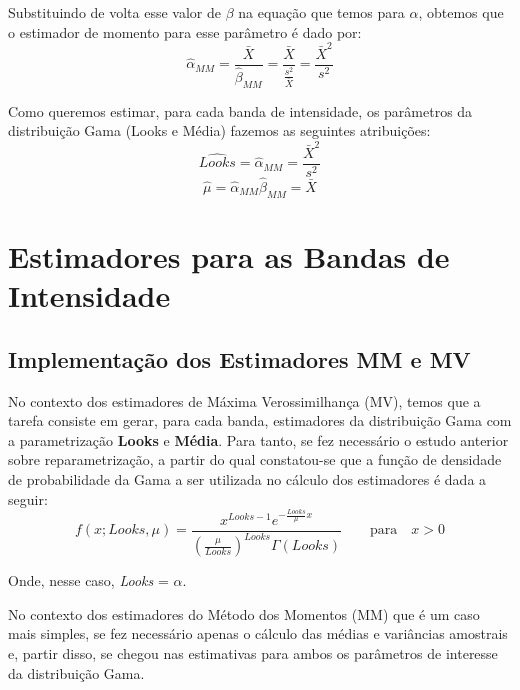 Substituindo de volta esse valor de  \begin{math} \beta \end{math} na equação que temos para \begin{math} \alpha \end{math}, obtemos que o estimador de momento para esse parâmetro é dado por:
\begin{equation}
\hat{\alpha}_{MM}=\dfrac{\bar{X}}{\hat{\beta}_{MM}}=\dfrac{\bar{X}}{\frac{s^2}{\bar{X}}}=\dfrac{\bar{X}^2}{s^2}
\end{equation}

Como queremos estimar, para cada banda de intensidade, os parâmetros da distribuição Gama (Looks e Média) fazemos as seguintes atribuições:
\begin{equation}
    \hat{Looks} = \hat{\alpha}_{MM} = \dfrac{\bar{X}^2}{s^2}
\end{equation}
\begin{equation}
    \hat{\mu} = \hat{\alpha}_{MM}\hat{\beta}_{MM} = \bar{X}
\end{equation}



\section{Estimadores para as Bandas de Intensidade}

\subsection{Implementação dos Estimadores MM e MV}

No contexto dos estimadores de Máxima Verossimilhança (MV), temos que a tarefa consiste em gerar, para cada banda, estimadores da distribuição Gama com a parametrização \textbf{Looks} e \textbf{Média}. Para tanto, se fez necessário o estudo anterior sobre reparametrização, a partir do qual constatou-se que a função de densidade de probabilidade da Gama a ser utilizada no cálculo dos estimadores é dada a seguir:
\begin{equation}
 f(x; \textit{Looks}, \mu) = \frac{x^{Looks-1}e^{-\frac{Looks}{\mu} x}}{(\frac{\mu}{Looks})^{Looks}\Gamma(Looks)} \qquad \text{para} \quad x > 0
\end{equation} 

Onde, nesse caso, \textit{Looks} = $\alpha$.

No contexto dos estimadores do Método dos Momentos (MM) que é um caso mais simples, se fez necessário apenas o cálculo das médias e variâncias amostrais e, partir disso, se chegou nas estimativas para ambos os parâmetros de interesse da distribuição Gama.

